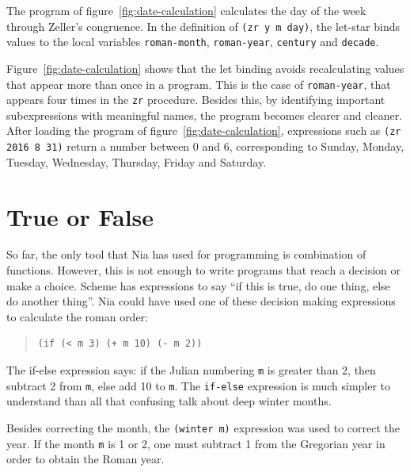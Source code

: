 \documentclass[a4paper,12pt]{book}
\begin{document}
The program of figure~\ref{fig:date-calculation}
calculates the day of the week
through Zeller's congruence. In the definition
of \verb|(zr y m day)|, the let-star 
binds values to the local variables \verb|roman-month|,
\verb|roman-year|, \verb|century| and \verb|decade|.

Figure~\ref{fig:date-calculation} shows that
the let binding avoids recalculating values that
appear more than once in a program. This
is the case of \verb|roman-year|, that
appears four times in the \verb|zr| procedure.
Besides this, by identifying important
subexpressions with meaningful names, the
program becomes clearer and cleaner.
After loading the program of
figure~\ref{fig:date-calculation},
expressions
such as
\verb|(zr 2016 8 31)| return
a number between 0 and 6, corresponding to
Sunday, Monday, Tuesday, Wednesday,
Thursday, Friday and Saturday.

\section{True or False}
So far, the only tool that Nia has used
for programming is combination of functions.
However, this is not enough to write
programs that reach a decision or
make a choice. Scheme has expressions
to say ``if this is true, do one thing,
else do another thing''. Nia 
could have used one of these decision
making expressions to calculate the roman
order:
\begin{quote}
\begin{verbatim}
(if (< m 3) (+ m 10) (- m 2))
\end{verbatim}
\end{quote}
The if-else expression says: if the
Julian numbering \verb|m| is greater
than 2, then subtract 2 from \verb|m|,
else add 10 to \verb|m|. The \verb|if-else|
expression is much simpler to understand
than all that confusing talk about deep
winter months.

Besides correcting the month, the \verb|(winter m)|
expression was used to correct the year. If
the month \verb|m| is 1 or 2, one must subtract
1 from the Gregorian year in order to obtain
the Roman year.
\end{document}
